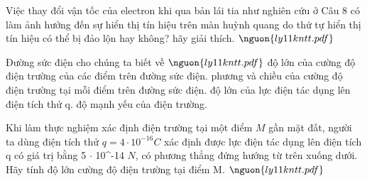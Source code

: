 \begin{ex}
Việc thay đổi vận tốc của electron khi qua bản lái tia như nghiên cứu ở Câu 8 có làm ảnh hưởng đến sự hiển thị tín hiệu trên màn huỳnh quang do thứ tự hiển thị tín hiệu có thể bị đảo lộn hay không? hãy giải thích. $\nguon{ly11 kntt.pdf}$
\choiceTF

\end{ex}

\begin{ex}
Đường sức điện cho chúng ta biết về $\nguon{ly11 kntt.pdf}$
\choice
{độ lớn của cường độ điện trường của các điểm trên đường sức điện.}
{\True phương và chiều của cường độ điện trường tại mỗi điểm trên đường sức điện.}
{độ lớn của lực điện tác dụng lên điện tích thử q.}
{độ mạnh yếu của điện trường.}
\end{ex}

\begin{ex}
Khi làm thực nghiệm xác định điện trường tại một điểm $M$ gần mặt đất, người ta dùng điện tích thử $q = 4 \cdot  10^{-16} C$ xác định được lực điện tác dụng lên điện tích q có giá trị bằng 5 $\cdot$  10^{-14} $N$, có phương thẳng đứng hướng từ trên xuống dưới. Hãy tính độ lớn cường độ điện trường tại điểm M. $\nguon{ly11kntt.pdf}$
\choiceTF

\end{ex}

